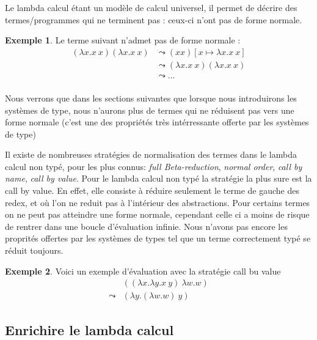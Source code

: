 \documentclass {article}
\theoremstyle{definition}
\newtheorem{example}{Exemple}
\theoremstyle{remark}
\begin{document}
Le lambda calcul étant un modèle de calcul universel, il permet de 
décrire des termes/programmes qui ne terminent pas : ceux-ci n'ont pas 
de forme normale.

\begin{example}
 
  Le terme suivant n'admet pas de forme normale :
  \begin{align*}
  (\lambda x. x\: x) (\lambda x. x\: x) &\leadsto (x x)[x \mapsto \lambda x. x\: x] \\
                                        &\leadsto (\lambda x. x\: x) (\lambda x. x\: x) \\
                                        &\leadsto \ldots \\
  \end{align*}
\end{example}
Nous verrons que dans les sections suivantes que lorsque nous introduirons 
les systèmes de type, nous n'aurons plus de termes qui ne réduisent pas vers 
une forme normale (c'est une des propriétés très intérressante offerte par 
les systèmes de type)

Il existe de nombreuses stratégies de normalisation des termes dans le lambda 
calcul non typé, pour les plus connus: \emph{full Beta-reduction}, \emph{normal order}, 
\emph{call by name}, \emph{call by value}.
Pour le lambda calcul non typé la stratégie la plus sure est la call by value.
En effet, elle consiste à réduire seulement le terme de gauche des redex, et où l'on 
ne reduit pas à l'intérieur des abstractions.
Pour certains termes on ne peut pas atteindre 
une forme normale, cependant celle ci a moins de risque de rentrer dans une boucle
d'évaluation infinie. Nous n'avons pas encore les proprités offertes par les
systèmes de types tel que un terme correctement typé se réduit toujours.

\begin{example}
  Voici un exemple d'évaluation avec la stratégie call bu value
  \begin{align*}
    & ((\lambda x.\lambda y. x\: y)\: \lambda w.w)  \\
    \leadsto & (\lambda y. (\lambda w.w)\: y) 
  \end{align*}
\end{example}





\subsection{Enrichire le lambda calcul}
\end{document}
